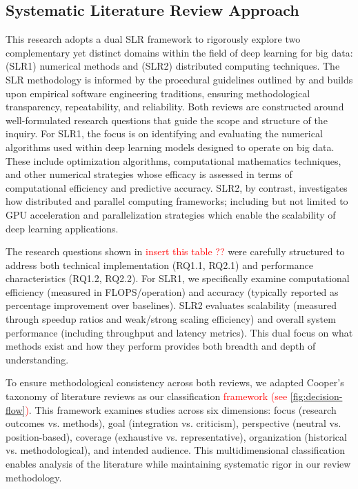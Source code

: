 \documentclass[acmsmall]{acmart}
\newcommand{\ATM}[1]{\textcolor{red}{#1}}
\begin{document}
\subsection{Systematic Literature Review Approach}\label{subsec:systematic-literature-review-approach}
This research adopts a dual SLR framework to rigorously explore two complementary yet distinct domains within the field of deep learning for big data: (SLR1) numerical methods and (SLR2) distributed computing techniques. The SLR methodology is informed by the procedural guidelines outlined by \citet{kitchenham2004procedures} and builds upon empirical software engineering traditions, ensuring methodological transparency, repeatability, and reliability. Both reviews are constructed around well-formulated research questions that guide the scope and structure of the inquiry. For SLR1, the focus is on identifying and evaluating the numerical algorithms used within deep learning models designed to operate on big data. These include optimization algorithms, computational mathematics techniques, and other numerical strategies whose efficacy is assessed in terms of computational efficiency and predictive accuracy. SLR2, by contrast, investigates how distributed and parallel computing frameworks; including but not limited to GPU acceleration and parallelization strategies which enable the scalability of deep learning applications.

The research questions shown in \ATM{insert this table ??} were carefully structured to address both technical implementation (RQ1.1, RQ2.1) and performance characteristics (RQ1.2, RQ2.2). For SLR1, we specifically examine computational efficiency (measured in FLOPS/operation) and accuracy (typically reported as percentage improvement over baselines).  SLR2 evaluates scalability (measured through speedup ratios and weak/strong scaling efficiency) and overall system performance (including throughput and latency metrics). This dual focus on what methods exist and how they perform provides both breadth and depth of understanding.

To ensure methodological consistency across both reviews, we adapted Cooper's taxonomy of literature reviews \citep{cooper1988organizing} as our classification \ATM{framework (see \cref{fig:decision-flow})}. This framework examines studies across six dimensions: focus (research outcomes vs. methods), goal (integration vs. criticism), perspective (neutral vs. position-based), coverage (exhaustive vs. representative), organization (historical vs. methodological), and intended audience. This multidimensional classification enables analysis of the literature while maintaining systematic rigor in our review methodology.
\end{document}
